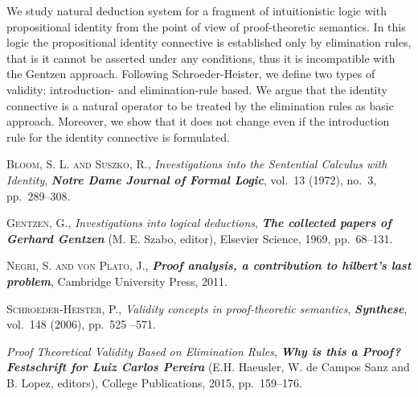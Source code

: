 \documentclass[bsl,meeting]{asl}
\newcommand{\NP}{}
\begin{document}
\thispagestyle{empty}


\NP  
{}



	We study natural deduction system for a fragment of intuitionistic logic with propositional identity from the point of view of proof-theoretic semantics. In this logic the propositional identity connective is established only by elimination rules, that is it cannot be asserted under any conditions, thus it is incompatible with the Gentzen approach. Following Schroeder-Heister, we define two types of validity: introduction- and elimination-rule based. We argue that the identity connective is a natural operator to be treated by the elimination rules as basic approach. Moreover, we show that it does not change even if the introduction rule for the identity connective is formulated. 


\begin{thebibliography}{10}

{\scshape Bloom, S. L. and Suszko, R.},
{\itshape Investigations into the {S}entential {C}alculus with {I}dentity},
{\bfseries\itshape Notre Dame Journal of Formal Logic},
vol.~13 (1972), no.~3, pp.~289--308.

{\scshape Gentzen, G.},
{\itshape Investigations into logical deductions},
{\bfseries\itshape The collected papers of Gerhard Gentzen}
(M. E. Szabo, editor),
Elsevier Science,
1969,
pp.~68--131.

{\scshape Negri, S. and  von Plato, J.},
{\bfseries\itshape Proof analysis, a contribution to hilbert’s last
problem},
Cambridge University Press,
2011.

{\scshape Schroeder-Heister, P.},
{\itshape Validity concepts in proof-theoretic semantics},
{\bfseries\itshape Synthese},
vol.~148 (2006), pp.~525 --571.


\bysame
{\itshape Proof Theoretical Validity Based on Elimination Rules},
{\bfseries\itshape Why is this a Proof? Festschrift for Luiz Carlos Pereira}
(E.H. Haeusler, W. de Campos Sanz and B. Lopez, editors),
College Publications,
2015,
pp.~159--176.


\end{thebibliography}


\vspace*{-0.5\baselineskip}
\end{document}
